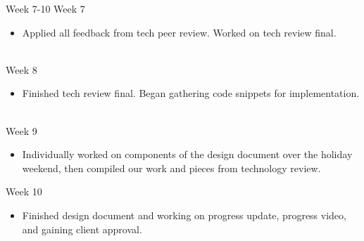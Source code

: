 \documentclass{beamer}
\begin{document}
\begin{frame}{Week 7-10}
    Week 7
    \begin{itemize} %
        \item Applied all feedback from tech peer review. Worked on tech review final. 
    \end{itemize}
    \hrulefill\\
    Week 8
    \begin{itemize} %
        \item Finished tech review final. Began gathering code snippets for implementation. 
    \end{itemize}
    \hrulefill\\
    Week 9
    \begin{itemize} %
        \item Individually worked on components of the design document over the holiday weekend, then compiled our work and pieces from technology review. 
    \end{itemize}
    Week 10
    \begin{itemize} %
        \item Finished design document and working on progress update, progress video, and gaining client approval. 
    \end{itemize}
\end{frame}
\end{document}
